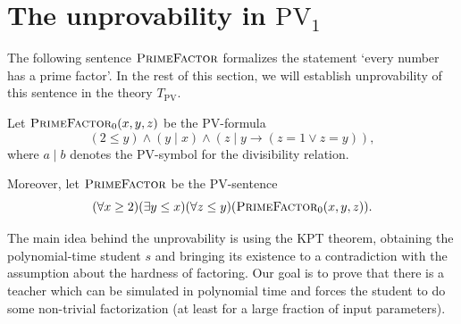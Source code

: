 \documentclass{lmcs}
\newcommand{\PV}{\text{PV}}
\newcommand{\PrimeFactor}{\textsc{PrimeFactor}}
\begin{document}
\section{The unprovability in $\PV_1$}\label{secpv}

The following sentence $\PrimeFactor$ formalizes the statement `every number has a prime factor'. In the rest of this section, we will establish unprovability of this sentence in the theory $T_{\PV}$.

\begin{defi}
    Let $\PrimeFactor_0(x,y,z)$ be the $\PV$-formula
    \[(2\leq  y) \land (y\mid x) \land (z\mid y \to (z=1 \lor z=y)),\]
    where $a \mid b$ denotes the $\PV$-symbol for the divisibility relation.
    
    Moreover, let $\PrimeFactor$ be the $\PV$-sentence
    \[(\forall x\geq 2)(\exists y\leq x)(\forall z\leq y)(\PrimeFactor_0(x,y,z)).\]
\end{defi}

The main idea behind the unprovability is using the KPT theorem, obtaining the polynomial-time student $s$ and bringing its existence to a contradiction with the assumption about the hardness of factoring. Our goal is to prove that there is a teacher which can be simulated in polynomial time and forces the student to do some non-trivial factorization (at least for a large fraction of input parameters).
\end{document}
